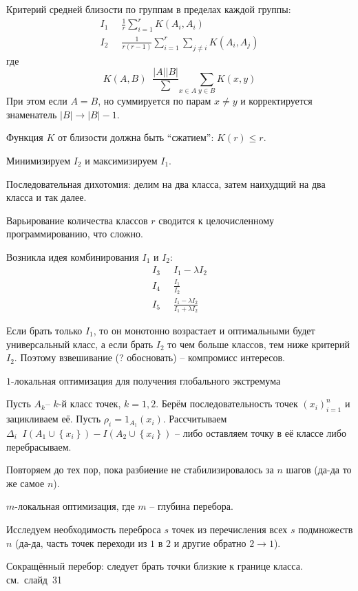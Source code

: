 \documentclass[a4paper]{article}
\newcommand{\obj}[1]{{\left\{ #1 \right \}}}
\newcommand{\brac}[1]{{\left ( #1 \right )}}
\newcommand{\abs}[1]{{\left | #1 \right |}}
\newcommand{\defn}{\mathop{\overset{\Delta}{=}}\nolimits}
\begin{document}
Критерий средней близости по группам в пределах каждой группы:
\begin{align*}
	I_1&\defn \frac{1}{r}\sum_{i=1}^r K(A_i, A_i)\\
	I_2&\defn \frac{1}{r(r-1)}\sum_{i=1}^r\sum_{j\neq i} K(A_i, A_j)
\end{align*}
где \[K(A, B)\defn \frac{\abs{A}\abs{B}} \sum_{x\in A}\sum_{y\in B} K(x,y)\]
При этом если $A=B$, но суммируется по парам $x\neq y$ и корректируется знаменатель $\abs{B}\to\abs{B}-1$.

Функция $K$ от близости должна быть ``сжатием'': $K(r)\leq r$.

Минимизируем $I_2$ и максимизируем $I_1$.

Последовательная дихотомия: делим на два класса, затем наихудщий на два класса и так далее.

Варьирование количества классов $r$ сводится к целочисленному программированию, что сложно.

Возникла идея комбинирования $I_1$ и $I_2$: 
\begin{align*}
	I_3 &\defn I_1 - \lambda I_2\\
	I_4 &\defn \frac{I_1}{I_2}\\
	I_5 &\defn \frac{I_1 - \lambda I_2}{I_1 + \lambda I_2}
\end{align*}

Если брать только $I_1$, то он монотонно возрастает и оптимальными будет универсальный класс, а если брать $I_2$ то чем больше классов, тем ниже критерий $I_2$. Поэтому взвешивание (? обосновать) -- компромисс интересов.

$1$-локальная оптимизация для получения глобального экстремума

Пусть $A_k$-- $k$-й класс точек, $k=1,2$.
Берём последовательность точек $\brac{x_i}_{i=1}^n$ и зацикливаем её.
Пусть $\rho_i = 1_{A_1}(x_i)$.
Рассчитываем $\Delta_i \defn I\brac{A_1\cup \obj{x_i}}-I\brac{A_2\cup \obj{x_i}}$ -- либо оставляем точку в её классе либо перебрасываем.

Повторяем до тех пор, пока разбиение не стабилизировалось за $n$  шагов (да-да то же самое $n$).

$m$-локальная оптимизация, где $m$ -- глубина перебора.

Исследуем необходимость переброса $s$ точек из перечисления всех $s$ подмножеств $n$
(да-да, часть точек переходи из $1$ в $2$ и другие обратно $2\to1$).

Сокращённый перебор: следует брать точки близкие к границе класса.
см.~слайд~31
\end{document}

